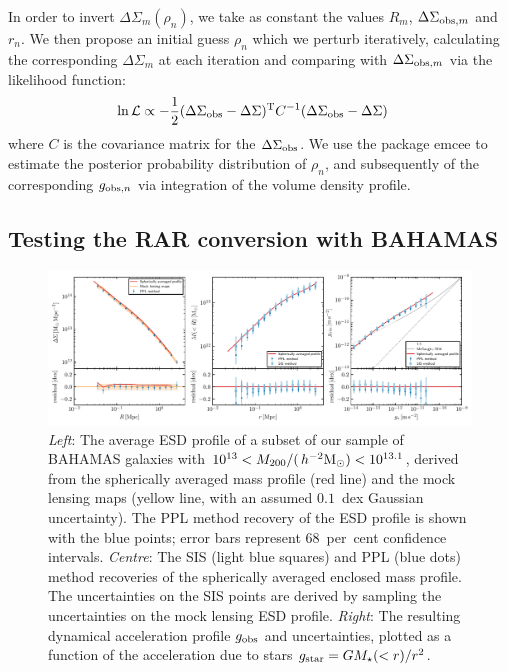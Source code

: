 \documentclass[usenatbib]{mnras}
\newcommand{\hmsun}{\,h^{-2} {\rm M_\odot}}
\newcommand{\un}[1]{_{\rm #1}}
\begin{document}
In order to invert $\Delta\Sigma_m(\rho_n)$, we take as constant the values $R_m$, $\Delta\Sigma_{{\rm obs},m}$ and $r_{n}$. We then propose an initial guess $\rho_n$ which we perturb iteratively, calculating the corresponding $\Delta\Sigma_m$ at each iteration and comparing with $\Delta\Sigma_{{\rm obs},m}$ via the likelihood function:
\begin{align}
	\ln\mathcal{L} &\propto -\frac{1}{2}(\Delta\Sigma\un{obs}-\Delta\Sigma)^{\rm T}C^{-1}(\Delta\Sigma\un{obs}-\Delta\Sigma)
\end{align}
where $C$ is the covariance matrix for the $\Delta\Sigma\un{obs}$. We use the package {\sc emcee} \citep{foreman-mackey13} to estimate the posterior probability distribution of $\rho_n$, and subsequently of the corresponding $g_{{\rm obs},n}$ via integration of the volume density profile.


\subsection{Testing the RAR conversion with BAHAMAS}
\label{sec:conversion_test}

\begin{figure}
	\includegraphics[width=\textwidth]{Figures/compare_method}
	\caption{\emph{Left}: The average ESD profile of a subset of our sample of BAHAMAS galaxies with $10^{13}<M_{200}/(\hmsun)<10^{13.1}$, derived from the spherically averaged mass profile (red line) and the mock lensing maps (yellow line, with an assumed $0.1$~dex Gaussian uncertainty). The PPL method recovery of the ESD profile is shown with the blue points; error bars represent 68~per~cent confidence intervals. \emph{Centre}: The SIS (light blue squares) and PPL (blue dots) method recoveries of the spherically averaged enclosed mass profile. The uncertainties on the SIS points are derived by sampling the uncertainties on the mock lensing ESD profile. \emph{Right}: The resulting dynamical acceleration profile $g_{\rm obs}$ and uncertainties, plotted as a function of the acceleration due to stars $g_{\rm star}=GM_\star(<r)/r^2$.}
	\label{fig:compare_method}
\end{figure}
\end{document}
